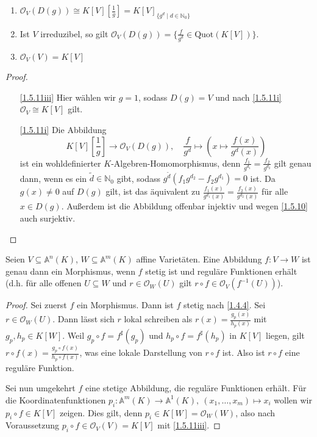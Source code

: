 \documentclass[a4paper,12pt]{scrbook}
\newtheorem{proof}{Beweis}
\def\A{\mathbb{A}}
\def\O{\mathcal{O}}
\newcommand{\ra}{\longrightarrow}
\newcommand{\Quot}{\mathrm{Quot}}
\newcommand{\set}[1]{\ensuremath{\mathbb{#1}}}
\newcommand{\N}{\set{N}}
\renewcommand{\mapsto}{\longmapsto}
\begin{document}
\begin{kor}\label{1.5.11}
  \begin{enumerate}
  \item{} $\O_V(D(g))\cong K[V][\frac1g] = K[V]_{\{g^d\mid d\in\N_0\}}$
  \item{} Ist $V$ irreduzibel, so gilt $\O_V(D(g))=\{\frac{f}{g^d}\in\Quot(K[V])\}$.
  \item{} $\O_V(V)=K[V]$
  \end{enumerate}
\end{kor}
\begin{proof}
  \begin{enumerate}
  \item[\ref{1.5.11iii}] Hier wählen wir $g=1$, sodass $D(g)=V$ und nach \ref{1.5.11i} $\O_V\cong K[V]$ gilt.
  \item[\ref{1.5.11i}] Die Abbildung
    \[K[V][\textstyle\frac1g]\ra\O_V(D(g)),\quad \displaystyle\frac{f}{g^d}\mapsto\left(x\mapsto\frac{f(x)}{g^d(x)}\right) \]
    ist ein wohldefinierter $K$-Algebren-Homomorphismus, denn $\frac{f_1}{g^{d_1}}=\frac{f_2}{g^{d_2}}$ gilt genau dann, wenn es
    ein $\tilde{d}\in\N_0$ gibt, sodass $g^{\tilde{d}}(f_1g^{d_2}-f_2g^{d_1})=0$ ist. Da $g(x)\neq0$ auf $D(g)$ gilt, ist das
    äquivalent zu $\frac{f_1(x)}{g^{d_1}(x)}=\frac{f_2(x)}{g^{d_2}(x)}$ für alle $x\in D(g)$. Außerdem ist die Abbildung
    offenbar injektiv und wegen \cref{1.5.10} auch surjektiv.
  \end{enumerate}
\end{proof}

\begin{prop}\label{1.5.12}
  Seien $V\subseteq\A^n(K)$, $W\subseteq\A^m(K)$ affine Varietäten. Eine Abbildung $f\colon V\ra W$ ist genau dann ein
  Morphismus, wenn $f$ stetig ist und reguläre Funktionen erhält (d.h. für alle offenen $U\subseteq W$ und $r\in\O_W(U)$ gilt
  $r\circ f\in\O_V(f^{-1}(U))$).
\end{prop}
\begin{proof}
  Sei zuerst $f$ ein Morphismus. Dann ist $f$ stetig nach \cref{1.4.4}. Sei $r\in\O_W(U)$. Dann lässt sich $r$ lokal
  schreiben als $r(x)=\frac{g_p(x)}{h_p(x)}$ mit $g_p,h_p\in K[W]$. Weil $g_p\circ f=f^\sharp(g_p)$ und $h_p\circ
  f=f^\sharp(h_p)$ in $K[V]$ liegen, gilt $r\circ f(x)=\frac{g_p\circ f(x)}{h_p\circ f(x)}$, was eine lokale Darstellung von
  $r\circ f$ ist. Also ist $r\circ f$ eine reguläre Funktion.

  Sei nun umgekehrt $f$ eine stetige Abbildung, die reguläre Funktionen erhält. Für die Koordinatenfunktionen $p_i\colon
  \A^m(K)\ra \A^1(K),\ (x_1,\dotsc,x_m)\mapsto x_i$ wollen wir $p_i\circ f\in K[V]$ zeigen. Dies gilt, denn $p_i\in K[W] =
  \O_W(W)$, also nach Voraussetzung $p_i\circ f\in\O_V(V)=K[V]$ mit \cref{1.5.11iii}.
\end{proof}
\end{document}
